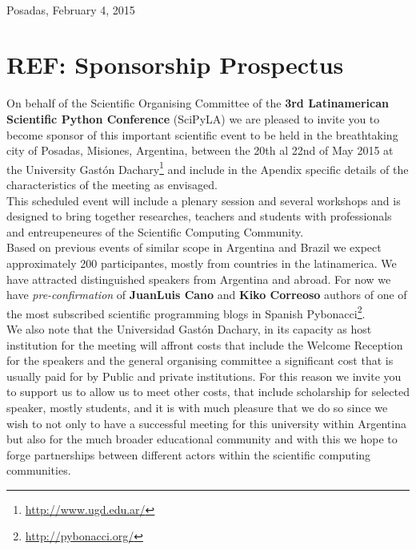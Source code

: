 \documentclass[11pt,a4paper]{report}
\begin{document}
\begin{center}
\end{center}


\hfill \\[0.2cm] Posadas, February 4, 2015\\[0.3cm]

\section*{REF: Sponsorship Prospectus}

On behalf of the Scientific Organising Committee of the
\textbf{3rd Latinamerican Scientific Python Conference} (SciPyLA) we are pleased to
invite you to become sponsor of this important scientific event to be held in
the breathtaking city of Posadas, Misiones, Argentina, between the
20th al 22nd of May 2015 at the  University Gastón
Dachary\footnote{\url{http://www.ugd.edu.ar/}} and include in the
Apendix specific details of the characteristics of the meeting as
envisaged. \\

This scheduled event will include a plenary session and several
workshops and is designed to bring together researches, teachers and
students with professionals and entreupeneures of the Scientific
Computing Community. \\[0.2cm]

Based on previous events of similar scope in Argentina and Brazil we
expect approximately 200 participantes, mostly from countries in the
latinamerica. We have attracted distinguished speakers from Argentina
and abroad. For now we have \emph{pre-confirmation} of \textbf{JuanLuis Cano}
and \textbf{Kiko Correoso} authors of one of the most
subscribed scientific programming blogs in Spanish
Pybonacci\footnote{\url{http://pybonacci.org/}}.\\[0.2cm]

We also note that the Universidad Gastón Dachary,  in its capacity as
host institution for the meeting will affront costs that include the
Welcome Reception for the speakers and the general organising
committee a significant cost that is usually paid for by Public and
private institutions. For this reason we invite you to support us to
allow us to meet other costs, that include scholarship for selected
speaker, mostly students, and it is with much pleasure that we do so
since we wish to not only to have a successful meeting for this
university within Argentina but also for the much broader educational
community and with this we hope to forge partnerships between
different actors within the scientific computing communities.
\end{document}

